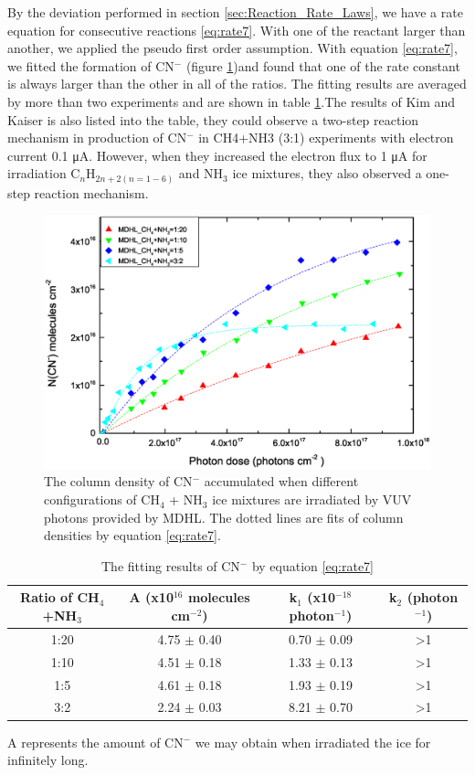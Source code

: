 By the deviation performed in section \ref{sec:Reaction_Rate_Laws}, we have a rate equation for consecutive reactions \ref{eq:rate7}. With one of the reactant larger than another, we applied the pseudo first order assumption. With equation \ref{eq:rate7}, we fitted the formation of CN$^-$ (figure \ref{fig:CNrate})and found that one of the rate constant is always larger than the other in all of the ratios. The fitting results are averaged by more than two experiments and are shown in table \ref{tab:CNrate}.The results of Kim and Kaiser is also listed into the table, they could observe a two-step reaction mechanism in production of CN$^-$ in CH4+NH3 (3:1) experiments with electron current 0.1 μA. However, when they increased the electron flux to 1 μA for irradiation C$_n$H$_{2n+2 (n=1-6)}$ and NH$_3$ ice mixtures, they also observed a one-step reaction mechanism.

\begin{figure}
\centering
\includegraphics[width=\textwidth]{figures/chapter3/Overall_CN_rate.eps}
\caption{The column density of CN$^-$ accumulated when different configurations of CH$_4$ + NH$_3$ ice mixtures are irradiated by VUV photons provided by MDHL. The dotted lines are fits of column densities by equation \ref{eq:rate7}.}
\label{fig:CNrate}
\end{figure}

\begin{table}[htbp]
\caption{The fitting results of CN$^-$ by equation \ref{eq:rate7}}
\label{tab:CNrate}
\begin{tabular}{cccc}
\hline
\hline
Ratio of CH$_4$+NH$_3$ & A (x10$^{16}$ molecules cm$^{-2}$) & k$_1$ (x10$^{-18}$ photon$^{-1}$) & k$_2$ (photon$^{-1}$)\\
\hline
1:20 & 4.75 $\pm$ 0.40 & 0.70 $\pm$ 0.09 & >1 \\
1:10 & 4.51 $\pm$ 0.18 & 1.33 $\pm$ 0.13 & >1 \\
1:5 & 4.61 $\pm$ 0.18 & 1.93 $\pm$ 0.19 & >1 \\
3:2 & 2.24 $\pm$ 0.03 & 8.21 $\pm$ 0.70 & >1 \\
\hline
\end{tabular}
A represents the amount of CN$^-$ we may obtain when irradiated the ice for infinitely long.\
\end{table}

